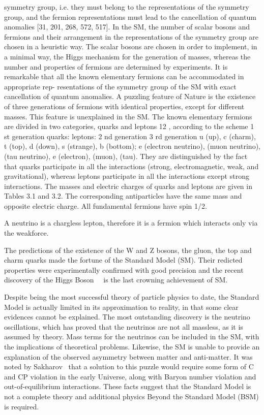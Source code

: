 symmetry group, i.e. they must belong to the representations of the symmetry %
group, and the fermion representations must lead to the cancellation of quantum
anomalies [31, 201, 268, 572, 517]. In the SM, the number of scalar bosons and
fermions and their arrangement in the representations of the symmetry group are
chosen in a heuristic way. The scalar bosons are chosen in order to implement, in
a minimal way, the Higgs mechanism for the generation of masses, whereas the
number and properties of fermions are determined by experiments. It is remarkable
that all the known elementary fermions can be accommodated in appropriate rep-
resentations of the symmetry group of the SM with exact cancellation of quantum
anomalies.
A puzzling feature of Nature is the existence of three generations of fermions
with identical properties, except for different masses. This feature is unexplained
in the SM.
The known elementary fermions are divided in two categories, quarks and
leptons 12 , according to the scheme
1 st generation
quarks:
leptons:
2 nd generation
3 rd generation
u (up),
c (charm),
t (top),
d (down),
s (strange),
b (bottom);
 e (electron neutrino),  (muon neutrino),  (tau neutrino),
e (electron),
 (muon),
 (tau).
They are distinguished by the fact that quarks participate in all the interactions
(strong, electromagnetic, weak, and gravitational), whereas leptons participate in
all the interactions except strong interactions. The masses and electric charges of
quarks and leptons are given in Tables 3.1 and 3.2. The corresponding antiparticles
have the same mass and opposite electric charge. All fundamental fermions have
spin 1/2.

A neutrino is a chargless lepton, therefore it is a fermion which interacts only %
via the weakforce.

The predictions of the existence of the W and Z bosons, the gluon, %
the top and charm quarks made the fortune of the Standard Model (SM).
Their redicted properties were experimentally confirmed with good precision and %
the recent discovery of the Higgs Boson~\cite{atlas:higgs}~\cite{cms:higgs} %
is the last crowning achievement of SM.

Despite being the most successful theory of particle physics to date, %
the Standard Model is actually limited in its approximation to reality, in that %
some clear evidences cannot be explained.
The most outstanding discovery is the neutrino oscillations, %
which has proved that the neutrinos are not all massless, %
as it is assumed by theory.
Mass terms for the neutrinos can be included in the SM, %
with the implications of theoretical problems.
Likewise, the SM is unable to provide an explanation of the observed asymmetry %
between matter and anti-matter.
It was noted by Sakharov~\cite{sak:cp} that a solution to this puzzle would require %
some form of C and CP violation in the early Universe, along with Baryon number violation %
and out-of-equilibrium interactions.
These facts suggest that the Standard Model is not a complete theory and %
additional physics Beyond the Standard Model (BSM) is required.

